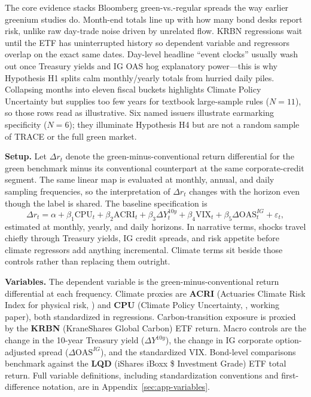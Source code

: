 \documentclass[
  11pt,
]{article}
\makeatletter
\renewcommand{\subsection}{\@startsection{subsection}{2}{\z@}{-1.6ex\@plus -0.5ex \@minus -.2ex}{0.6ex \@plus.2ex}{\normalfont\large\bfseries\color{TitleBlue}}}
\makeatother
\begin{document}
The core evidence stacks Bloomberg green-vs.-regular spreads the way earlier greenium studies do. Month-end totals line up with how many bond desks report risk, unlike raw day-trade noise driven by unrelated flow. KRBN regressions wait until the ETF has uninterrupted history so dependent variable and regressors overlap on the exact same dates. Day-level headline ``event clocks'' usually wash out once Treasury yields and IG OAS hog explanatory power---this is why Hypothesis H1 splits calm monthly/yearly totals from hurried daily piles. Collapsing months into eleven fiscal buckets highlights Climate Policy Uncertainty but supplies too few years for textbook large-sample rules ($N = 11$), so those rows read as illustrative. Six named issuers illustrate earmarking specificity ($N = 6$); they illuminate Hypothesis H4 but are not a random sample of TRACE or the full green market.

\subsection{Baseline specification}

\textbf{Setup.} Let \(\Delta r_t\) denote the green-minus-conventional
return differential for the green benchmark minus its conventional
counterpart at the same corporate-credit segment. The same linear map is
evaluated at monthly, annual, and daily sampling frequencies, so the
interpretation of \(\Delta r_t\) changes with the horizon even though the
label is shared. The baseline specification is
\[
\Delta r_t = \alpha + \beta_1 \mathrm{CPU}_t + \beta_2 \mathrm{ACRI}_t + \beta_3 \Delta Y_t^{10y} + \beta_4 \mathrm{VIX}_t + \beta_5 \Delta \mathrm{OAS}_t^{IG} + \varepsilon_t,
\]
estimated at monthly, yearly, and daily horizons. In narrative terms, shocks travel chiefly through Treasury yields, IG credit spreads, and risk appetite before climate regressors add anything incremental. Climate terms sit beside those controls rather than replacing them outright.

\textbf{Variables.} The dependent variable is the green-minus-conventional
return differential at each frequency. Climate proxies are
\textbf{ACRI} (Actuaries Climate Risk Index for physical risk,
) and
\textbf{CPU} (Climate Policy Uncertainty,
, working paper), both
standardized in regressions. Carbon-transition exposure is proxied by
the \textbf{KRBN} (KraneShares Global Carbon) ETF return. Macro controls
are the change in the 10-year Treasury yield (\(\Delta Y^{10y}\)), the
change in IG corporate option-adjusted spread (\(\Delta \mathrm{OAS}^{IG}\)),
and the standardized VIX. Bond-level comparisons benchmark against the
\textbf{LQD} (iShares iBoxx \$ Investment Grade) ETF total return. Full
variable definitions, including standardization conventions and
first-difference notation, are in Appendix~\ref{sec:app-variables}.
\end{document}
